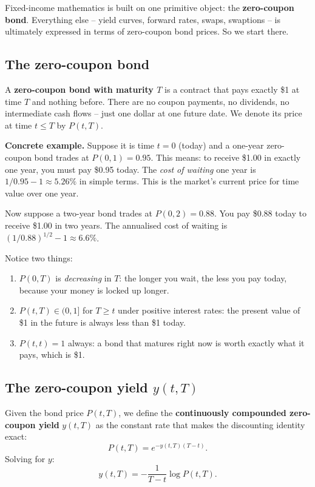 \documentclass[11pt]{article}
\begin{document}
Fixed-income mathematics is built on one primitive object: the
\textbf{zero-coupon bond}.  Everything else -- yield curves, forward rates,
swaps, swaptions -- is ultimately expressed in terms of zero-coupon bond
prices.  So we start there.

\subsection{The zero-coupon bond}

A \textbf{zero-coupon bond with maturity $T$} is a contract that pays
exactly \$1 at time $T$ and nothing before.  There are no coupon payments,
no dividends, no intermediate cash flows -- just one dollar at one future
date.  We denote its price at time $t \le T$ by $P(t,T)$.

\begin{example_box}
\textbf{Concrete example.}  Suppose it is time $t = 0$ (today) and a
one-year zero-coupon bond trades at $P(0,1) = 0.95$.  This means: to
receive \$1.00 in exactly one year, you must pay \$0.95 today.  The
\emph{cost of waiting} one year is $1/0.95 - 1 \approx 5.26\%$ in simple
terms.  This is the market's current price for time value over one year.

Now suppose a two-year bond trades at $P(0,2) = 0.88$.  You pay \$0.88
today to receive \$1.00 in two years.  The annualised cost of waiting is
$(1/0.88)^{1/2} - 1 \approx 6.6\%$.

Notice two things:
\begin{enumerate}
  \item $P(0,T)$ is \emph{decreasing} in $T$: the longer you wait, the
  less you pay today, because your money is locked up longer.
  \item $P(t,T) \in (0,1]$ for $T \ge t$ under positive interest rates:
  the present value of \$1 in the future is always less than \$1 today.
  \item $P(t,t) = 1$ always: a bond that matures right now is worth
  exactly what it pays, which is \$1.
\end{enumerate}
\end{example_box}

\subsection{The zero-coupon yield $y(t,T)$}

Given the bond price $P(t,T)$, we define the \textbf{continuously
compounded zero-coupon yield} $y(t,T)$ as the constant rate that makes the
discounting identity exact:
\[
P(t,T) = e^{-y(t,T)(T-t)}.
\]
Solving for $y$:
\[
y(t,T) = -\frac{1}{T-t}\log P(t,T).
\]
\end{document}
